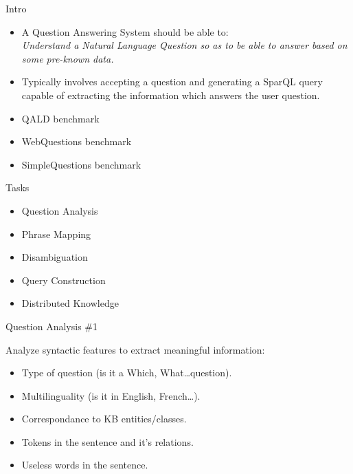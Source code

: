 \documentclass{beamer}
\begin{document}
\begin{frame}{Intro}
  \begin{cardTiny}
    \begin{itemize}
      \item A Question Answering System should be able to: \\
      \textit{Understand a Natural Language Question so as to be able to answer based on some pre-known data.}
    \end{itemize}
  \end{cardTiny}
  \begin{cardTiny}
    \begin{itemize}
      \item Typically involves accepting a question and generating a SparQL query capable of extracting the information which answers the user question.
    \end{itemize}
  \end{cardTiny}
  \begin{cardTiny}
    \begin{itemize}
      \item QALD benchmark
      \item WebQuestions benchmark
      \item SimpleQuestions benchmark
    \end{itemize}
  \end{cardTiny}
\end{frame}

\begin{frame}{Tasks}
  \begin{card}
    \begin{itemize}
      \item Question Analysis
      \item Phrase Mapping
      \item Disambiguation
      \item Query Construction
      \item Distributed Knowledge
    \end{itemize}
  \end{card}
\end{frame}

\begin{frame}{Question Analysis \#1}
  \begin{card}
    Analyze syntactic features to extract meaningful information:
    \begin{itemize}
      \item Type of question (is it a Which, What\dots question).
      \item Multilinguality (is it in English, French\dots).
      \item Correspondance to KB entities/classes.
      \item Tokens in the sentence and it's relations.
      \item Useless words in the sentence.
    \end{itemize}
  \end{card}
\end{frame}
\end{document}
